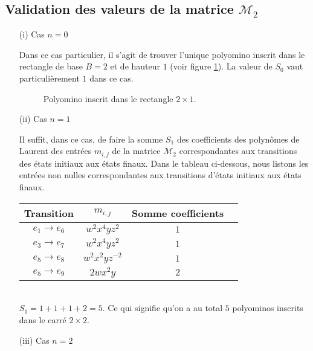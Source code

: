 \subsection{Validation des valeurs de la matrice $\mathcal{M}_{2}$}
\begin{itemize}
\item[(i)] Cas $n=0$

Dans ce cas particulier, il s'agit de trouver l'unique polyomino inscrit dans le rectangle de base $B=2$ et de hauteur $1$ (voir figure \ref{uni2}). La valeur de $S_{0}$ vaut particulièrement $1$ dans ce cas.
 \begin{figure}[!htb]
 \begin{minipage}[c]{.26\linewidth}
  \centering
  \end{minipage}
  \hfill
\begin{minipage}[c]{.56\linewidth}
  \centering
\begin{logicpuzzle}[rows=1,columns=2,color=cyan!100, width=750px,scale=0.5]
\framepuzzle[black!50]
\end{logicpuzzle}
\end{minipage}
\caption{\label{uni2} Polyomino inscrit dans le rectangle $2\times 1$.}
\end{figure}
\item[(ii)] Cas $n=1$

Il suffit, dans ce cas, de faire la somme $S_{1}$ des coefficients des polynômes de Laurent des entrées $m_{i,j}$ de la matrice $\mathcal{M}_{2}$  correspondantes aux transitions des états initiaux aux états finaux. Dans le tableau ci-dessous, nous listons les entrées  non nulles correspondantes aux transitions d'états initiaux aux états finaux.\\

\begin{tabular}{|c|c|c|c|}
 \hline
  Transition& $m_{i,j}$ & Somme  coefficients\\
 \hline
 $e_{1}\rightarrow e_{6}$ & $w^{2}x^{4}yz^{2}$ & $1$ \\
 \hline
 $e_{3}\rightarrow e_{7}$ & $w^{2}x^{4}yz^{2}$ & $1$ \\
 \hline
 $e_{5}\rightarrow e_{8}$ & $w^{2}x^{2}yz^{-2}$ & $1$ \\
 \hline
 $e_{5}\rightarrow e_{9}$ & $2wx^{2}y$ & $2$ \\
 \hline
\end{tabular}
\mbox{ }\\
$S_{1}=1+1+1+2=5$. Ce qui signifie qu'on a au total $5$ polyominos inscrits dans le carré $2\times 2$.
\item[(iii)] Cas $n=2$


\end{itemize}
